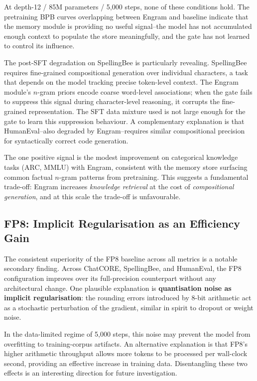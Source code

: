 At depth-12 / 85M parameters / 5{,}000 steps, none of these conditions hold.
The pretraining BPB curves overlapping between Engram and baseline indicate that the memory
module is providing no useful signal--the model has not accumulated enough context to populate
the store meaningfully, and the gate has not learned to control its influence.

The post-SFT degradation on SpellingBee is particularly revealing.
SpellingBee requires fine-grained compositional generation over individual characters, a task
that depends on the model tracking precise token-level context.
The Engram module's \(n\)-gram priors encode coarse word-level associations; when the gate fails to suppress this signal during character-level reasoning, it corrupts the fine-grained representation. The SFT data mixture used is not large enough for the gate to learn this suppression behaviour. A complementary explanation is that HumanEval--also degraded by Engram--requires similar compositional precision for syntactically correct code generation.

The one positive signal is the modest improvement on categorical knowledge tasks (ARC, MMLU)
with Engram, consistent with the memory store surfacing common factual \(n\)-gram patterns from pretraining. This suggests a fundamental trade-off: Engram increases \emph{knowledge retrieval} at the cost of \emph{compositional generation}, and at this scale the trade-off is unfavourable.

\subsection{FP8: Implicit Regularisation as an Efficiency Gain}

The consistent superiority of the FP8 baseline across all metrics is a notable secondary finding. Across ChatCORE, SpellingBee, and HumanEval, the FP8 configuration improves over its
full-precision counterpart without any architectural change. One plausible explanation is \textbf{quantisation noise as implicit regularisation}: the rounding errors introduced by 8-bit arithmetic act as a stochastic perturbation of the gradient, similar in spirit to dropout or weight noise.

In the data-limited regime of 5{,}000 steps, this noise may prevent the model from overfitting
to training-corpus artifacts. An alternative explanation is that FP8's higher arithmetic throughput allows more tokens to be processed per wall-clock second, providing an effective increase in training data. Disentangling these two effects is an interesting direction for future investigation.

